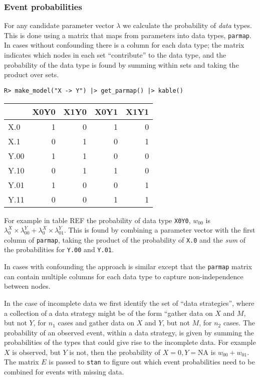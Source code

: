 \documentclass[
  11pt,
  article]{jss}
\begin{document}
\hypertarget{event-probabilities}{%
\subsubsection{Event probabilities}\label{event-probabilities}}

For any candidate parameter vector \(\lambda\) we calculate the
probability of \emph{data} types. This is done using a matrix that maps
from parameters into data types, \texttt{parmap}. In cases without
confounding there is a column for each data type; the matrix indicates
which nodes in each set ``contribute'' to the data type, and the
probability of the data type is found by summing within sets and taking
the product over sets.

\begin{verbatim}
R> make_model("X -> Y") |> get_parmap() |> kable()
\end{verbatim}

\begin{tabular}{l|r|r|r|r}
\hline
  & X0Y0 & X1Y0 & X0Y1 & X1Y1\\
\hline
X.0 & 1 & 0 & 1 & 0\\
\hline
X.1 & 0 & 1 & 0 & 1\\
\hline
Y.00 & 1 & 1 & 0 & 0\\
\hline
Y.10 & 0 & 1 & 1 & 0\\
\hline
Y.01 & 1 & 0 & 0 & 1\\
\hline
Y.11 & 0 & 0 & 1 & 1\\
\hline
\end{tabular}

For example in table REF the probability of data type \texttt{X0Y0},
\(w_{00}\) is
\(\lambda^X_0\times \lambda^Y_{00} + \lambda^X_0\times \lambda^Y_{01}\).
This is found by combining a parameter vector with the first column of
\texttt{parmap}, taking the product of the probability of \texttt{X.0}
and the \emph{sum} of the probabilities for \texttt{Y.00} and
\texttt{Y.01}.

In cases with confounding the approach is similar except that the
\texttt{parmap} matrix can contain multiple columns for each data type
to capture non-independence between nodes.

In the case of incomplete data we first identify the set of ``data
strategies'', where a collection of a data strategy might be of the form
``gather data on \(X\) and \(M\), but not \(Y\), for \(n_1\) cases and
gather data on \(X\) and \(Y\), but not \(M\), for \(n_2\) cases. The
probability of an observed event, within a data strategy, is given by
summing the probabilities of the types that could give rise to the
incomplete data. For example \(X\) is observed, but \(Y\) is not, then
the probability of \(X=0, Y = \text{NA}\) is \(w_{00} +w_{01}\). The
matrix \(E\) is passed to \texttt{stan} to figure out which event
probabilities need to be combined for events with missing data.
\end{document}
